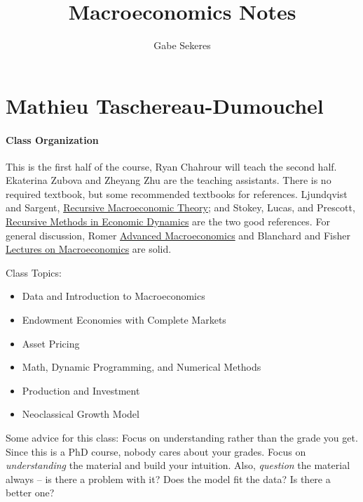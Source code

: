 \documentclass[10pt]{article}
\title{Macroeconomics Notes}
\author{Gabe Sekeres}
\begin{document}
\maketitle


\tableofcontents

\newpage


\section{Mathieu Taschereau-Dumouchel}

\paragraph{Class Organization} This is the first half of the course, Ryan Chahrour will teach the second half. Ekaterina Zubova and Zheyang Zhu are the teaching assistants. There is no required textbook, but some recommended textbooks for references. Ljundqvist and Sargent, \href{https://mitpress.mit.edu/9780262038669/recursive-macroeconomic-theory/}{Recursive Macroeconomic Theory}; and Stokey, Lucas, and Prescott, \href{https://www.hup.harvard.edu/books/9780674750968}{Recursive Methods in Economic Dynamics} are the two good references. For general discussion, Romer \href{https://www.mheducation.com/highered/product/advanced-macroeconomics-romer/M9781260185218.html}{Advanced Macroeconomics} and Blanchard and Fisher \href{https://home.ufam.edu.br/andersonlfc/MacroI/Livro\%20Macro\%20Pos-Graduacao.pdf}{Lectures on Macroeconomics} are solid.

Class Topics:
\begin{itemize}
	\item Data and Introduction to Macroeconomics
	\item Endowment Economies with Complete Markets
	\item Asset Pricing
	\item Math, Dynamic Programming, and Numerical Methods
	\item Production and Investment
	\item Neoclassical Growth Model
\end{itemize}

Some advice for this class: Focus on understanding rather than the grade you get. Since this is a PhD course, nobody cares about your grades. Focus on \emph{understanding} the material and build your intuition. Also, \emph{question} the material always -- is there a problem with it? Does the model fit the data? Is there a better one?
\end{document}
